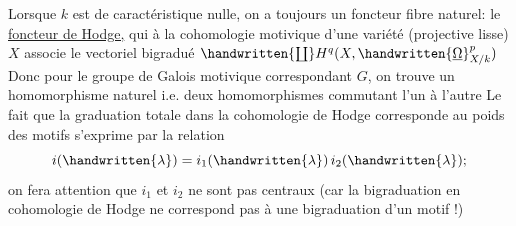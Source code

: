 
Lorsque $k$ est de caractéristique nulle, on a toujours un foncteur fibre naturel: le \uline{foncteur de Hodge,} qui à la cohomologie motivique d'une variété (projective lisse) $X$ associe le vectoriel bigradué $\handwritten{\coprod}H^q(X,\handwritten{\underline{\Omega}}^p_{X/k})$ Donc pour le groupe de Galois motivique correspondant $G$, on trouve un homomorphisme naturel\quad{}
i.e. deux homomorphismes commutant l'un à l'autre\hspace{1em}
Le fait que la graduation totale dans la cohomologie de Hodge corresponde au poids des motifs s'exprime par la relation
\[
i(\handwritten{\lambda})=i_1(\handwritten{\lambda})\,i_2(\handwritten{\lambda});
\]
on fera attention que $i_1$ et $i_2$ ne sont pas centraux (car la bigraduation en cohomologie de Hodge ne correspond pas à une bigraduation d'un motif !)

